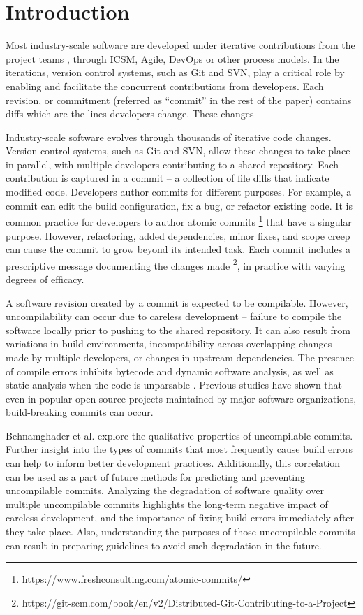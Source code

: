 \section{Introduction}
Most industry-scale software are developed under iterative contributions from the project teams \cite{}, through ICSM, Agile, DevOps or other process models. 
In the iterations, version control systems, such as Git and SVN, play a critical role by enabling and facilitate the concurrent contributions from developers.
Each revision, or commitment (referred as ``commit'' in the rest of the paper) contains diffs which are the lines developers change.
These changes 

Industry-scale software evolves through thousands of iterative code changes. Version control systems, such as Git and SVN, allow these changes to take place in parallel, with multiple developers contributing to a shared repository. Each contribution is captured in a commit -- a collection of file diffs that indicate modified code.
Developers author commits for different purposes.
For example, a commit can edit the build configuration, fix a bug, or refactor existing code.
It is common practice for developers to author atomic commits \footnote{https://www.freshconsulting.com/atomic-commits/} that have a singular purpose. However, refactoring, added dependencies, minor fixes, and scope creep can cause the commit to grow beyond its intended task. Each commit includes a prescriptive message documenting the changes made \footnote{https://git-scm.com/book/en/v2/Distributed-Git-Contributing-to-a-Project}, in practice with varying degrees of efficacy. 

A software revision created by a commit is expected to be compilable. However, uncompilability can occur due to careless development -- failure to compile the software locally prior to pushing to the shared repository. It can also result from variations in build environments, incompatibility across overlapping changes made by multiple developers, or changes in upstream dependencies. 
The presence of compile errors inhibits bytecode and dynamic software analysis, as well as static analysis when the code is unparsable \cite{Behnamghader_ESEM}.
Previous studies \cite{Behnamghader_ESEM, 8170083, Hassan2017ESEM, SMR:SMR1838} have shown that even in popular open-source projects maintained by major software organizations, build-breaking commits can occur.

Behnamghader et al.\cite{Behnamghader_QRS} explore the qualitative properties of uncompilable commits.
Further insight into the types of commits that most frequently cause build errors can help to inform better development practices. Additionally, this correlation can be used as a part of future methods for predicting and preventing uncompilable commits. 
Analyzing the degradation of software quality over multiple uncompilable commits highlights the long-term negative impact of careless development, and the importance of fixing build errors immediately after they take place.
Also, understanding the purposes of those uncompilable commits can result in preparing guidelines to avoid such degradation in the future.

